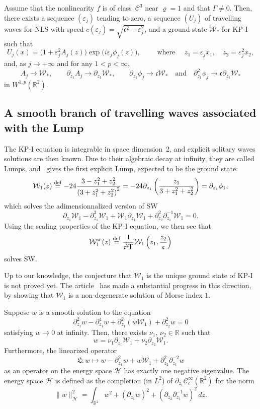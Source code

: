 \documentclass[AHL,Unicode,longabstracts,published]{cedram}
\newcommand*\p{\partial}
\newcommand*\R{\mathbb R}
\newcommand*\ddef{\stackrel{\rm def}{=}}
\renewcommand{\sc}{\mathrm{sc}}
\newcommand*\BC{\mathcal{C}}
\newcommand*\BH{\mathcal{H}}
\newcommand*\BW{\mathcal{W}}
\newcommand*\cs{{\mathfrak c}}
\newcommand{\fkL}{\mathfrak{L}}
\newcommand*\ii{\infty}
\newcommand*\e{\varepsilon}
\newcommand*\G{\Gamma}
\begin{document}
\begin{theo}\label{res1}
Assume that the nonlinearity $f$ is of class~$ \BC^3 $ near $ \varrho = 1 $ and that $ \G \neq 0$. Then, there exists a sequence $ (\e_j) $ tending to zero, a sequence $ (U_j) $ of travelling waves for NLS with speed $ c (\e_j) = \sqrt{ \cs ^2 - \e_j^2} $, and a ground state $ \BW_* $ for KP-I such that
\[
U_j (x) = \big(1 + \e_j^2 A_j (z) \big)
\exp \big(i \e_j \phi_j (z) \big), \qquad  \text{ where } \quad z_1 = \e_j x_1, \quad z_2 = \e_j^2 x_2,
\]
and, as $ j \to + \ii $ and for any $1 < p < \ii $,
\[
A_j \to \BW_*, \qquad
\p_{z_1} A_j \to \p_{z_1} \BW_*, \qquad
\p_{z_1} \phi_j \to \cs \BW_* \quad \text{and} \quad
\p_{z_1} ^2 \phi_j \to \cs \p_{z_1} \BW_*
\]
in $ W^{1,p}(\R^2) $.
\end{theo}



\subsection{A smooth branch of travelling waves associated with the Lump}

The KP-I equation is integrable in space dimension~2, and explicit solitary waves solutions are then known. Due to their algebraic decay at infinity, they are called Lumps, and~\cite{MZBM} gives the first explicit Lump, expected to be the ground state:
\[
\BW_1 (z) \ddef - 24 \frac{3 - z_1^2 + z_2^2}{\left(3 + z_1^2 + z_2^2\right)^2} = - 24 \p_{z_1} \left(\frac{z_1}{3 + z_1^2 + z_2^2 } \right) = \p_{z_1} \phi_1,
\]
which solves the adimensionnalized version of SW
\[
\p_{z_1} \BW_1 - \p^3_{z_1} \BW_1 + \BW_1 \p_{z_1} \BW_1 + \p_{z_2}^2 \p_{z_1}^{-1} \BW_1 = 0.
\]
Using the scaling properties of the KP-I equation, we then see that
\begin{equation}\label{Wsc_NLS}
\BW_1^{\sc} (z) \ddef \frac{1}{\cs^2 \G} \BW_1 \left(z_1, \frac{z_2}{\cs} \right)
\end{equation} solves SW.

Up to our knowledge, the conjecture that $ \BW_1 $ is the unique ground state of KP-I is not proved yet. The article~\cite{Liu_Wei_Lump} has made a substantial progress in this direction, by showing that $ \BW_1 $ is a non-degenerate solution of Morse index $1$.



\begin{theo}\label{Lump_nondege}
Suppose $w$ is a smooth solution to the equation
\[
\p_{z_1}^2 w - \p^4_{z_1} w + \p_{z_1}^2 (w \BW_1) + \p_{z_2}^2 w = 0
\]
satisfying $ w \to 0 $ at infinity. Then, there exists $ \nu_1 $, $ \nu_2 \in \R $ such that
\[
w = \nu_1 \p_{z_1} \BW_1 + \nu_2 \p_{z_2} \BW_1.
\]
Furthermore, the linearized operator
\[
\fkL : w \mapsto w - \p^2_{z_1} w + w \BW_1 + \p_{z_2}^2 \p_{z_1}^{-2} w
\]
as an operator on the energy space $ \BH $ has exactly one negative eigenvalue. The energy space $ \BH $ is defined as the completion (in $ L^2 $) of $ \p_{z_1} \BC_c^\ii(\R^2) $ for the norm
\[
\| w \|_{\BH}^2 = \int_{\R^2} w^2 + (\p_{z_1} w)^2 + \left(\p_{z_2} \p_{z_1}^{-1} w\right)^2 \, dz.
\]
\end{theo}
\end{document}
